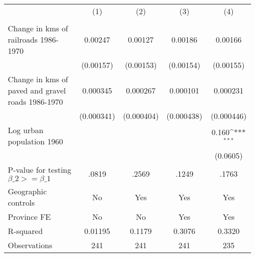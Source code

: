 {
\def\sym#1{\ifmmode^{#1}\else\(^{#1}\)\fi}
\begin{tabular}{l*{4}{c}}
\hline\hline
                &\multicolumn{1}{c}{(1)}&\multicolumn{1}{c}{(2)}&\multicolumn{1}{c}{(3)}&\multicolumn{1}{c}{(4)}\\
                &\multicolumn{1}{c}{}&\multicolumn{1}{c}{}&\multicolumn{1}{c}{}&\multicolumn{1}{c}{}\\
\hline
Change in kms of railroads 1986-1970&  0.00247         &  0.00127         &  0.00186         &  0.00166         \\
                &(0.00157)         &(0.00153)         &(0.00154)         &(0.00155)         \\
[1em]
Change in kms of paved and gravel roads 1986-1970& 0.000345         & 0.000267         & 0.000101         & 0.000231         \\
                &(0.000341)         &(0.000404)         &(0.000438)         &(0.000446)         \\
[1em]
Log urban population 1960&                  &                  &                  &    0.160\sym{***}\\
                &                  &                  &                  & (0.0605)         \\
\hline
P-value for testing $\beta\_{2} >= \beta\_{1}$&    .0819         &    .2569         &    .1249         &    .1763         \\
Geographic controls&       No         &      Yes         &      Yes         &      Yes         \\
Province FE     &       No         &       No         &      Yes         &      Yes         \\
R-squared       &  0.01195         &   0.1179         &   0.3076         &   0.3320         \\
Observations    &      241         &      241         &      241         &      235         \\
\hline\hline
\end{tabular}
}
